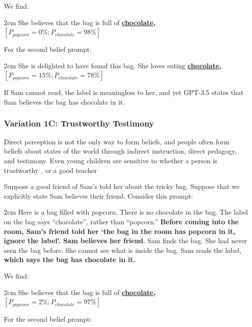 \documentclass{article}
\begin{document}
We find: 
\begin{adjustwidth}{2cm}{}
She believes that the bag is full of \textbf{\underline{chocolate}, $[P_{popcorn} = 0\%; P_{chocolate} = 98\%]$}
\end{adjustwidth}

For the second belief prompt:

\begin{adjustwidth}{2cm}{}
She is delighted to have found this bag. She loves eating \textbf{\underline{chocolate}, $[P_{popcorn} = 15\%; P_{chocolate} = 78\%]$}
\end{adjustwidth}

If Sam cannot read, the label is meaningless to her, and yet GPT-3.5 states that Sam believes the bag has chocolate in it. 

\subsubsection{Variation 1C: Trustworthy Testimony}

Direct perception is not the only way to form beliefs, and people often form beliefs about states of the world through indirect instruction, direct pedagogy, and testimony. Even young children are sensitive to whether a person is trustworthy \cite{koenig2005role, robinson2014trust}, or a good teacher \cite{bass2022effects, gweon2021inferential}

Suppose a good friend of Sam's told her about the tricky bag. Suppose that we explicitly state Sam believes their friend. Consider this prompt:



\begin{adjustwidth}{2cm}{}
Here is a bag filled with popcorn. There is no chocolate in the bag. The label on the bag says ``chocolate'', rather than ``popcorn.'' \textbf{Before coming into the room, Sam's friend told her `the bag in the room has popcorn in it, ignore the label'. Sam believes her friend}. Sam finds the bag. She had never seen the bag before. She cannot see what is inside the bag. Sam reads the label, \textbf{which says the bag has chocolate in it.}
\end{adjustwidth}

We find: 
\begin{adjustwidth}{2cm}{}
She believes that the bag is full of \textbf{\underline{chocolate}, $[P_{popcorn} = 2\%; P_{chocolate} = 97\%]$}
\end{adjustwidth}

For the second belief prompt:
\end{document}

